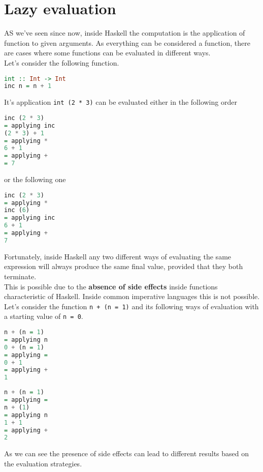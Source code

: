 \newpage
\chapter{Lazy evaluation}
AS we've seen since now, inside Haskell the computation is the application of function to given arguments. As everything can be considered a function, there are cases where some functions can be evaluated in different ways.  \\
Let's consider the following function.

\begin{lstlisting}[language=haskell]
int :: Int -> Int
inc n = n + 1
\end{lstlisting}

It's application \texttt{int (2 * 3)} can be evaluated either in the following order

\begin{lstlisting}[language=haskell]
inc (2 * 3)
= applying inc
(2 * 3) + 1
= applying *
6 + 1
= applying +
= 7
\end{lstlisting}

or the following one

\begin{lstlisting}[language=haskell]
inc (2 * 3) 
= applying *
inc (6)
= applying inc 
6 + 1
= applying +
7
\end{lstlisting}

Fortunately, inside Haskell any two different ways of evaluating the same expression will always produce the same final value, provided that they both terminate. \\
This is possible due to the \textbf{absence of side effects} inside functions characteristic of Haskell. Inside common imperative languages this is not possible. Let's consider the function \texttt{n + (n = 1)} and its following ways of evaluation with a starting value of \texttt{n = 0}.

\begin{lstlisting}[language=haskell]
n + (n = 1)
= applying n
0 + (n = 1)
= applying =
0 + 1
= applying +
1
\end{lstlisting} 

\begin{lstlisting}[language=haskell]
n + (n = 1)
= applying =
n + (1)
= applying n
1 + 1
= applying +
2
\end{lstlisting}

As we can see the presence of side effects can lead to different results based on the evaluation strategies. 

